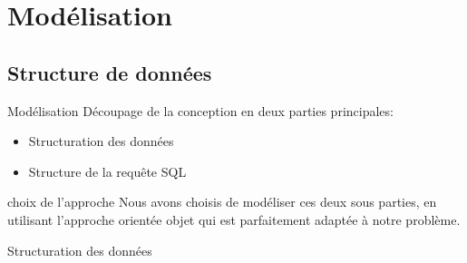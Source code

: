 \documentclass[10pt,handout]{beamer}
\newif\ifplacelogo %
\begin{document}
\section{Modélisation}

\subsection{Structure de données}

\begin{frame}{Modélisation}
Découpage de la conception en deux parties principales:
\begin{itemize}
  \item Structuration des données
  \item Structure de la requête SQL
\end{itemize}

\begin{block}{choix de l'approche}
  Nous  avons  choisis  de  modéliser  ces deux sous parties,  
  en  utilisant  l’approche  orientée objet  qui  est  parfaitement adaptée à notre  problème.
  
\end{block}




\end{frame}

\placelogofalse
\begin{frame}{Structuration des données}
\end{frame}
\placelogotrue

\end{document}
